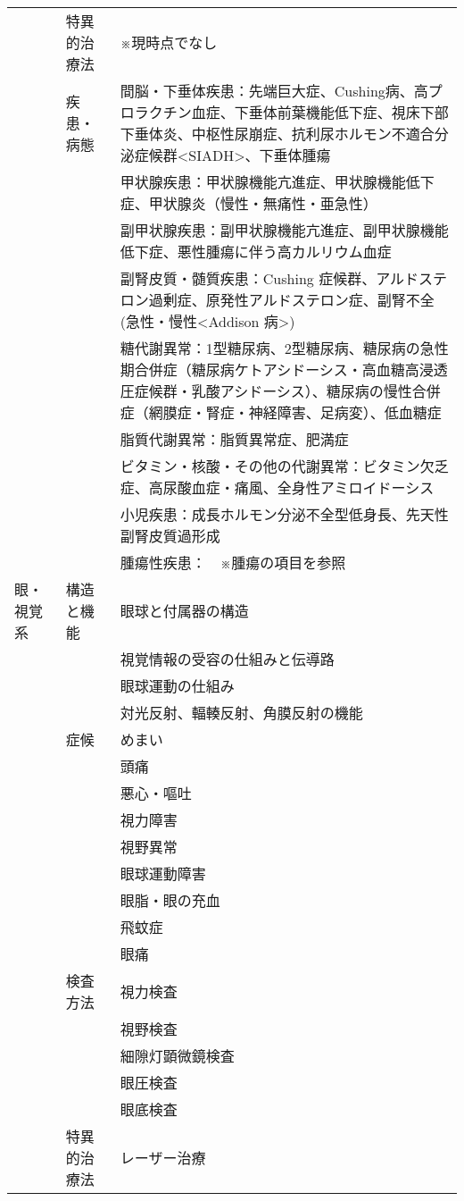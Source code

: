 \begin{xltabular}{\linewidth}{XXX}
 & 特異的治療法 & ※現時点でなし \\
 & 疾患・病態 & 間脳・下垂体疾患：先端巨大症、Cushing病、高プロラクチン血症、下垂体前葉機能低下症、視床下部下垂体炎、中枢性尿崩症、抗利尿ホルモン不適合分泌症候群<SIADH>、下垂体腫瘍 \\
 &  & 甲状腺疾患：甲状腺機能亢進症、甲状腺機能低下症、甲状腺炎（慢性・無痛性・亜急性） \\
 &  & 副甲状腺疾患：副甲状腺機能亢進症、副甲状腺機能低下症、悪性腫瘍に伴う高カルリウム血症 \\
 &  & 副腎皮質・髄質疾患：Cushing 症候群、アルドステロン過剰症、原発性アルドステロン症、副腎不全(急性・慢性<Addison 病>) \\
 &  & 糖代謝異常：1型糖尿病、2型糖尿病、糖尿病の急性期合併症（糖尿病ケトアシドーシス・高血糖高浸透圧症候群・乳酸アシドーシス）、糖尿病の慢性合併症（網膜症・腎症・神経障害、足病変）、低血糖症 \\
 &  & 脂質代謝異常：脂質異常症、肥満症 \\
 &  & ビタミン・核酸・その他の代謝異常：ビタミン欠乏症、高尿酸血症・痛風、全身性アミロイドーシス \\
 &  & 小児疾患：成長ホルモン分泌不全型低身長、先天性副腎皮質過形成 \\
 &  & 腫瘍性疾患：　※腫瘍の項目を参照 \\
眼・視覚系 & 構造と機能 & 眼球と付属器の構造 \\
 &  & 視覚情報の受容の仕組みと伝導路 \\
 &  & 眼球運動の仕組み \\
 &  & 対光反射、輻輳反射、角膜反射の機能 \\
 & 症候 & めまい \\
 &  & 頭痛 \\
 &  & 悪心・嘔吐 \\
 &  & 視力障害 \\
 &  & 視野異常 \\
 &  & 眼球運動障害 \\
 &  & 眼脂・眼の充血 \\
 &  & 飛蚊症 \\
 &  & 眼痛 \\
 & 検査方法 & 視力検査 \\
 &  & 視野検査 \\
 &  & 細隙灯顕微鏡検査 \\
 &  & 眼圧検査 \\
 &  & 眼底検査 \\
 & 特異的治療法 & レーザー治療 \\

\end{xltabular}
